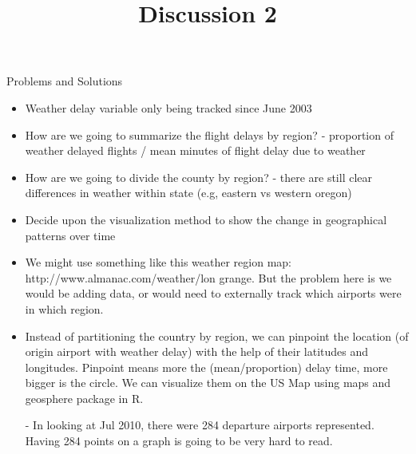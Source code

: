 \documentclass[12pt]{article}
\begin{document}
\title{Discussion 2}
\maketitle

Problems and Solutions

\begin{itemize}
\item Weather delay variable only being tracked since June 2003

\item How are we going to summarize the flight delays by region? - proportion of weather delayed flights / mean minutes of flight delay due to weather

\item How are we going to divide the county by region? - there are still clear differences in weather within state (e.g, eastern vs western oregon)

\item Decide upon the visualization method to show the change in geographical patterns over time

\end{itemize}

\break

\begin{itemize}

\item We might use something like this weather region map: http://www.almanac.com/weather/lon
grange. But the problem here is we would be adding data, or would need to externally track which airports were in which region.

\item Instead of partitioning the country by region, we can pinpoint the location (of origin airport with weather delay) with the help of their latitudes and longitudes. Pinpoint means more the (mean/proportion) delay time, more bigger is the circle. We can visualize them on the US Map using maps and geosphere package in R. 

- In looking at  Jul 2010, there were 284 departure airports represented. Having 284 points on a graph is going to be very hard to read.

\end{itemize}
\end{document}
